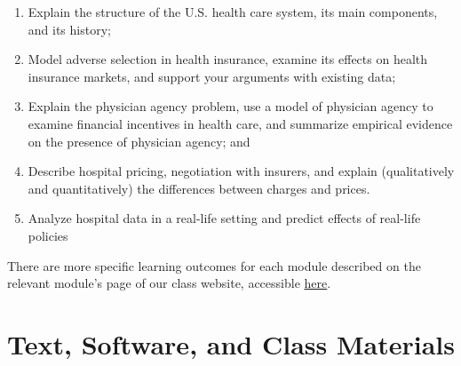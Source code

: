 \documentclass[11pt,]{article}
\begin{document}
\begin{enumerate}
\def\labelenumi{\arabic{enumi}.}
\item
  Explain the structure of the U.S. health care system, its main
  components, and its history;
\item
  Model adverse selection in health insurance, examine its effects on
  health insurance markets, and support your arguments with existing
  data;
\item
  Explain the physician agency problem, use a model of physician agency
  to examine financial incentives in health care, and summarize
  empirical evidence on the presence of physician agency; and
\item
  Describe hospital pricing, negotiation with insurers, and explain
  (qualitatively and quantitatively) the differences between charges and
  prices.
\item
  Analyze hospital data in a real-life setting and predict effects of
  real-life policies
\end{enumerate}

There are more specific learning outcomes for each module described on
the relevant module's page of our class website, accessible
\href{https://econ372s23.classes.ianmccarthyecon.com/}{here}.

\hypertarget{text-software-and-class-materials}{%
\section{Text, Software, and Class
Materials}\label{text-software-and-class-materials}}
\end{document}
